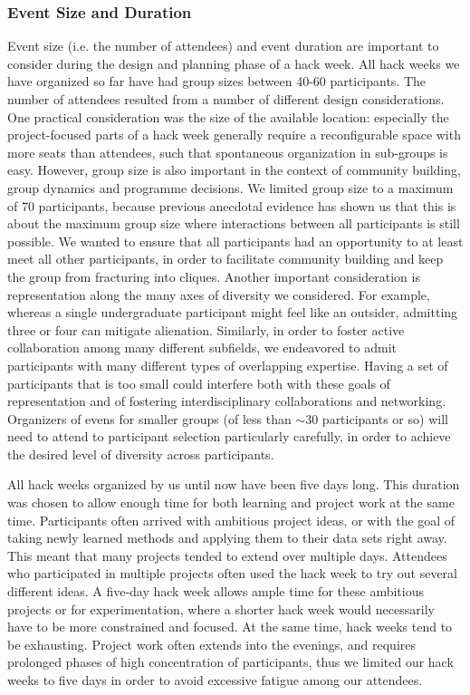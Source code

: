 \documentclass{aastex62}
\begin{document}
\subsubsection{Event Size and Duration}

Event size (i.e. the number of attendees) and event duration are important to consider during the design and planning phase of a hack week. All hack weeks we have organized so far have had group sizes between 40-60 participants. The number of attendees resulted from a number of different design considerations. One practical consideration was the size of the available location: especially the project-focused parts of a hack week generally require a reconfigurable space with more seats than attendees, such that spontaneous organization in sub-groups is easy. However, group size is also important in the context of community building, group dynamics and programme decisions. We limited group size to a maximum of 70 participants, because previous anecdotal evidence has shown us that this is about the maximum group size where interactions between all participants is still possible. We wanted to ensure that all participants had an opportunity to at least meet all other participants, in order to facilitate community building and keep the group from fracturing into cliques. Another important consideration is representation along the many axes of diversity we considered. For example, whereas a single undergraduate participant might feel like an outsider, admitting three or four can mitigate alienation. Similarly, in order to foster active collaboration among many different subfields, we endeavored to admit participants with many different types of overlapping expertise. Having a set of participants that is too small could interfere both with these goals of representation and of fostering interdisciplinary collaborations and networking. Organizers of evens for smaller groups (of less than $\sim$30 participants or so) will need to attend to participant selection particularly carefully, in order to achieve the desired level of diversity across participants.

All hack weeks organized by us until now have been five days long. This duration was chosen to allow enough time for both learning and project work at the same time. Participants often arrived with ambitious project ideas, or with the goal of taking newly learned methods and applying them to their data sets right away. This meant that many projects tended to extend over multiple days. Attendees who participated in multiple projects often used the hack week to try out several different ideas. A five-day hack week allows ample time for these ambitious projects or for experimentation, where a shorter hack week would necessarily have to be more constrained and focused. At the same time, hack weeks tend to be exhausting. Project work often extends into the evenings, and requires prolonged phases of high concentration of participants, thus we limited our hack weeks to five days in order to avoid excessive fatigue among our attendees.
\end{document}
